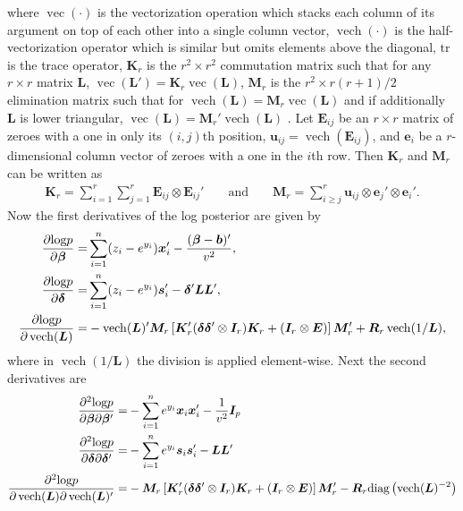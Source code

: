 \documentclass[12pt]{article}
\def\diag{\hbox{diag}}
\def\diag{\hbox{diag}}
\def\log{\hbox{log}}
\DeclareMathOperator{\vect}{vec}
\DeclareMathOperator{\vech}{vech}
\begin{document}
\begin{appendix}
where $\vect(\cdot)$ is the vectorization operation which stacks each column of its argument on top of each other into a single column vector, $\vech(\cdot)$ is the half-vectorization operator which is similar but omits elements above the diagonal, $\mathrm{tr}$ is the trace operator, $\bm{K}_r$ is the $r^2\times r^2$ commutation matrix such that for any $r\times r$ matrix $\bm{L}$, $\vect(\bm{L}') = \bm{K}_r\vect(\bm{L})$, $\bm{M}_r$ is the $r^2\times r(r+1)/2$ elimination matrix such that for $\vech(\bm{L}) = \bm{M}_r\vect(\bm{L})$ and if additionally $\bm{L}$ is lower triangular, $\vect(\bm{L}) = \bm{M}_r'\vech(\bm{L})$ \citep{magnus1980elimination,magnus1988linear}. Let $\bm{E}_{ij}$ be an $r\times r$ matrix of zeroes with a one in only its $(i,j)$th position, $\bm{u}_{ij} = \vech(\bm{E}_{ij})$, and $\bm{e}_i$ be a $r$-dimensional column vector of zeroes with a one in the $i$th row. Then $\bm{K}_r$ and $\bm{M}_r$ can be written as
\begin{align*}
\bm{K}_r = \sum_{i=1}^r\sum_{j=1}^r\bm{E}_{ij} \otimes \bm{E}_{ij}' && \mbox{ and } &&\bm{M}_r = \sum_{i\ge j}^r\bm{u}_{ij}\otimes \bm{e}_j'\otimes \bm{e}_i'.
\end{align*}
Now the first derivatives of the log posterior are given by
\begin{align*}
\frac{\partial \log p}{\partial \bm{\beta}} =& \sum_{i=1}^n(z_i - e^{y_i})\bm{x}_i' - \frac{(\bm{\beta} - \bm{b})'}{v^2},\\
\frac{\partial \log p}{\partial \bm{\delta}} =& \sum_{i=1}^n(z_i - e^{y_i})\bm{s}_i' - \bm{\delta}'\bm{L}\bm{L}',\\
\frac{\partial \log p}{\partial \vech(\bm{L})} =& -\vech(\bm{L})'\bm{M}_r\left[\bm{K}_r'(\bm{\delta}\bm{\delta}'\otimes \bm{I}_r)\bm{K}_r + (\bm{I}_r\otimes \bm{E})\right]\bm{M}_r' + \bm{R}_r\vech(1/\bm{L}),
\end{align*}
where in $\vech(1/\bm{L})$ the division is applied element-wise. Next the second derivatives are
\begin{align*}
\frac{\partial^2 \log p}{\partial \bm{\beta} \partial \bm{\beta}'} =& -\sum_{i=1}^ne^{y_i}\bm{x}_i\bm{x}_i' - \frac{1}{v^2}\bm{I}_p\\
\frac{\partial^2 \log p}{\partial \bm{\delta} \partial \bm{\delta}'} =&-\sum_{i=1}^ne^{y_i}\bm{s}_i\bm{s}_i' - \bm{L}\bm{L}'\\
\frac{\partial^2 \log p}{\partial \vech(\bm{L}) \partial \vech(\bm{L})'} =& -\bm{M}_r\left[\bm{K}_r'(\bm{\delta}\bm{\delta}'\otimes \bm{I}_r)\bm{K}_r + (\bm{I}_r\otimes \bm{E})\right]\bm{M}_r' - \bm{R}_r\diag\left(\vech(\bm{L})^{-2}\right)\\

\end{align*}
\end{appendix}
\end{document}
